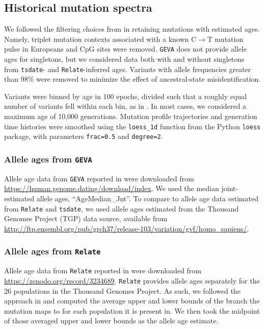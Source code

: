 \documentclass[]{article}
\newcommand{\GEVA}{\texttt{GEVA}\xspace}
\newcommand{\tsdate}{\texttt{tsdate}\xspace}
\newcommand{\relate}{\texttt{Relate}\xspace}
\begin{document}
\subsection*{Historical mutation spectra}

We followed the filtering choices from \citet{wang2023human} in retaining
mutations with estimated ages. Namely, triplet mutation contexts associated
with a known C$\rightarrow$T mutation pulse in Europeans
\citep{harris2015evidence} and CpG sites were removed. \GEVA does not provide
allele ages for singletons, but we considered data both with and without
singletons from \tsdate- and \relate-inferred ages. Variants with allele
frequencies greater than 98\% were removed to minimize the effect of
ancestral-state misidentification.

Variants were binned by age in 100 epochs, divided such that a roughly equal
number of variants fell within each bin, as in \citet{wang2023human}. In most
cases, we considered a maximum age of 10,000 generations. Mutation profile
trajectories and generation time histories were smoothed using the
\texttt{loess\_1d} function from the Python \texttt{loess} package, with
parameters \texttt{frac=0.5} and \texttt{degree=2}.

\subsubsection*{Allele ages from \GEVA}

Allele age data from \GEVA reported in \citet{albers2020dating} were downloaded
from \url{https://human.genome.dating/download/index}. We used the median
joint-estimated allele ages, ``AgeMedian\_Jnt''. To compare to allele age data
estimated from \relate and \tsdate, we used allele ages estimated from the
Thousand Genomes Project (TGP) data source, available from
\url{http://ftp.ensembl.org/pub/grch37/release-103/variation/gvf/homo_sapiens/}.

\subsubsection*{Allele ages from \relate}

Allele age data from \relate reported in \citet{speidel2019method} were
downloaded from \url{https://zenodo.org/record/3234689}. \relate provides
allele ages separately for the 26 populations in the Thousand Genomes Project.
As such, we followed the approach in \citet{wohns2022unified} and computed the
average upper and lower bounds of the branch the mutation maps to for each
population it is present in. We then took the midpoint of those averaged
upper and lower bounds as the allele age estimate.
\end{document}

